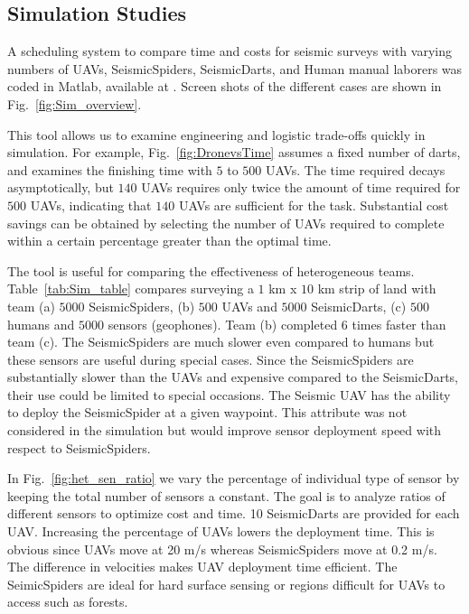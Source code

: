\subsection{Simulation Studies}

A scheduling system to compare  time and costs for seismic surveys with varying numbers of UAVs, SeismicSpiders, SeismicDarts, and Human manual laborers was coded in  {\sc Matlab}, available at \cite{Srikanth2016seismicScheduler}. Screen shots of the different cases are shown in Fig.~\ref{fig:Sim_overview}.

This tool allows us to examine engineering and logistic trade-offs quickly in simulation.  For example, Fig.~\ref{fig:DronevsTime} assumes a fixed number of darts, and examines the finishing time with $5$ to $500$ UAVs.  The time required decays asymptotically, but $140$ UAVs requires only twice the amount of time required for $500$ UAVs, indicating that $140$ UAVs are sufficient for the task.%
Substantial cost savings can be obtained by selecting the number of UAVs required to complete within a certain percentage greater than the optimal time.

The tool is useful for comparing the effectiveness of heterogeneous teams.  Table~\ref{tab:Sim_table} compares surveying a $1$ km x $10$ km strip of land with team (a) $5000$ SeismicSpiders, (b) $500$ UAVs and $5000$ SeismicDarts, (c) $500$ humans and $5000$ sensors (geophones).  Team (b) completed $6$ times faster than team (c). The SeismicSpiders are much slower even compared to humans but these sensors are useful during special cases. Since the SeismicSpiders are substantially slower than the UAVs and expensive compared to the SeismicDarts, their use could be limited to special occasions. The Seismic UAV has the ability to deploy the SeismicSpider at a given waypoint. This attribute was not considered in the simulation but would improve sensor deployment speed with respect to SeismicSpiders.
   
In Fig.~\ref{fig:het_sen_ratio} we vary the percentage of individual type of sensor by keeping the total number of sensors a constant. The goal is to analyze ratios of different sensors to optimize cost and time. 10 SeismicDarts are provided for each UAV. Increasing the percentage of UAVs lowers the deployment time. This is obvious since UAVs move at 20 m/s whereas SeismicSpiders move at 0.2 m/s. The difference in velocities makes UAV deployment time efficient. The SeimicSpiders are ideal for hard surface sensing or regions difficult for UAVs to access such as  forests.

